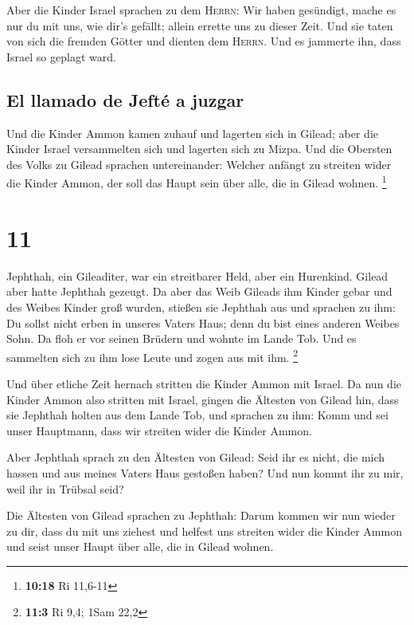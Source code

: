  Aber die Kinder Israel sprachen zu dem \textsc{Herrn}:
Wir haben gesündigt, mache es nur du mit uns, wie dir's gefällt; allein
errette uns zu dieser Zeit.  Und sie taten von sich die
fremden Götter und dienten dem \textsc{Herrn}. Und es jammerte ihn, dass
Israel so geplagt ward.

\hypertarget{el-llamado-de-jeftuxe9-a-juzgar}{%
\subsection{El llamado de Jefté a
juzgar}\label{el-llamado-de-jeftuxe9-a-juzgar}}

 Und die Kinder Ammon kamen zuhauf und lagerten sich in
Gilead; aber die Kinder Israel versammelten sich und lagerten sich zu
Mizpa.  Und die Obersten des Volks zu Gilead sprachen
untereinander: Welcher anfängt zu streiten wider die Kinder Ammon, der
soll das Haupt sein über alle, die in Gilead wohnen. \footnote{\textbf{10:18}
  Ri 11,6-11}

\hypertarget{section-10}{%
\section{11}\label{section-10}}

 Jephthah, ein Gileaditer, war ein streitbarer Held, aber
ein Hurenkind. Gilead aber hatte Jephthah gezeugt.  Da
aber das Weib Gileads ihm Kinder gebar und des Weibes Kinder groß
wurden, stießen sie Jephthah aus und sprachen zu ihm: Du sollst nicht
erben in unseres Vaters Haus; denn du bist eines anderen Weibes Sohn.
 Da floh er vor seinen Brüdern und wohnte im Lande Tob.
Und es sammelten sich zu ihm lose Leute und zogen aus mit ihm.
\footnote{\textbf{11:3} Ri 9,4; 1Sam 22,2}

 Und über etliche Zeit hernach stritten die Kinder Ammon
mit Israel.  Da nun die Kinder Ammon also stritten mit
Israel, gingen die Ältesten von Gilead hin, dass sie Jephthah holten aus
dem Lande Tob,  und sprachen zu ihm: Komm und sei unser
Hauptmann, dass wir streiten wider die Kinder Ammon.

 Aber Jephthah sprach zu den Ältesten von Gilead: Seid ihr
es nicht, die mich hassen und aus meines Vaters Haus gestoßen haben? Und
nun kommt ihr zu mir, weil ihr in Trübsal seid?

 Die Ältesten von Gilead sprachen zu Jephthah: Darum
kommen wir nun wieder zu dir, dass du mit uns ziehest und helfest uns
streiten wider die Kinder Ammon und seist unser Haupt über alle, die in
Gilead wohnen.

